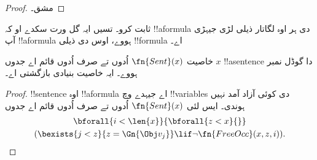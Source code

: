 \documentclass[../../../include/open-logic-section]{subfiles}
\begin{document}
\begin{proof}
مشق۔
\end{proof}

\begin{prob}
 ثابت کرو۔ تسیں ایہ
گل ورت سکدے او کہ !!a{formula} دی ہر اوہ لگاتار ذیلی لڑی
جیہڑی آپ !!a{formula} ہووے، اوس دی ذیلی !!{formula} اے۔
\end{prob}

\begin{prop}
خاصیت $\fn{Sent}(x)$ اُدوں تے صرف اُدوں قائم اے جدوں $x$
!!a{sentence} دا گوڈل نمبر ہووے۔ ایہ خاصیت بنیادی بازگشتی اے۔
\end{prop}

\begin{proof}
!!{sentence} اوہ !!a{formula} اے جیہدے وچ !!{variable}s دی
کوئی آزاد آمد نہیں ہوندی۔ ایس لئی $\fn{Sent}(x)$ اُدوں تے
صرف اُدوں قائم اے جدوں
\begin{multline*}
\bforall{i<\len{x}}{\bforall{z<x}{}}\\
(\bexists{j<z}{z=\Gn{\Obj v_j}} \lif \lnot\fn{FreeOcc}(x,z,i)).
\end{multline*}
\end{proof}
\end{document}
